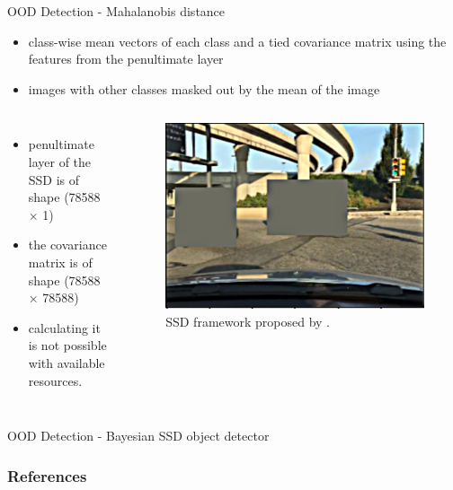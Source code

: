 \documentclass[10pt, aspectratio=169]{beamer}
\begin{document}
\begin{frame}[allowframebreaks]{OOD Detection - Mahalanobis distance}
    \begin{itemize}
        \item class-wise mean vectors of each class and a tied covariance matrix using the features from the penultimate layer
        \item images with other classes masked out by the mean of the image
    \end{itemize}
    \begin{columns}
            \begin{itemize}
                \item penultimate layer of the SSD is of shape (78588 × 1)
                \item the covariance matrix is of shape (78588 × 78588)
                \item calculating it is not possible with
                available resources.
            \end{itemize}
            \begin{figure}[!ht]
                \centering
                \includegraphics[scale=0.125]{images/rsz_1classspecific-image.png}
                \caption[SSD framework]{SSD framework proposed by \citet[p. 24]{Liu2016SSDSS}.}
            \end{figure}
    \end{columns}
\end{frame}

\begin{frame}[allowframebreaks]{OOD Detection - Bayesian SSD object detector}
    
\end{frame}


\begin{frame}[allowframebreaks]
    \frametitle{References}
    
    {\small
}
\end{frame}
\end{document}
